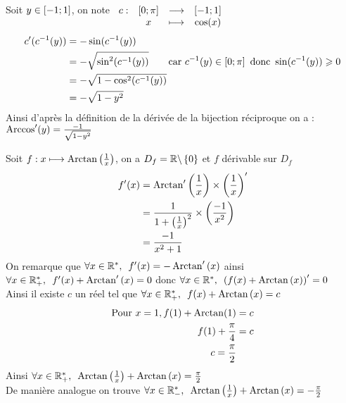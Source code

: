 \begin{dem}
	Soit \(y\in\left[-1;1\right]\), on note \(\begin{array}[t]{cccc}c : & \left[0;\pi\right] & \longrightarrow & \left[-1;1\right] \\ & x & \longmapsto & \cos(x)\end{array}\)
	\begin{align*}
		c'(c^{-1}(y)) & = -\sin(c^{-1}(y))                                                                                                \\
		              & = -\sqrt{\sin^2(c^{-1}(y))} \qquad  \text{car }c^{-1}(y)\in \left[0;\pi\right] \text{ donc } \sin(c^{-1}(y))\geqslant 0 \\
		              & = -\sqrt{1-\cos^2(c^{-1}(y))}                                                                                     \\
		              & = -\sqrt{1-y^2}                                                                                                   \\
	\end{align*}
	Ainsi d'après la définition de la dérivée de la bijection réciproque on a : \(\operatorname{Arccos}'(y) = \frac{-1}{\sqrt{1-y^2}}\)
\end{dem}

\begin{rem}
	Soit \(f:x\longmapsto \operatorname{Arctan}{\left(\frac{1}{x}\right)}\), on a \(D_f = \mathbb{R}\backslash\left\lbrace0\right\rbrace\) et \(f\) dérivable sur \(D_f\)
	\begin{align*}
		f'(x) & = \operatorname{Arctan}'\left(\frac{1}{x}\right) \times \left(\frac{1}{x}\right)'         \\
		      & = \frac{1}{1+\left(\frac{1}{x}\right)^2} \times \left(\frac{-1}{x^2}\right) \\
		      & = \frac{-1}{x^2+1}
	\end{align*}
	On remarque que \(\quantifs{\forall x \in \Rs}f'(x) = -\Arctan'\paren{x}\) ainsi \(\quantifs{\forall x \in \Rps}f'(x) +\Arctan'\paren{x} = 0\) donc \(\quantifs{\forall x \in \Rs}\paren{f(x)+\Arctan\paren{x}}'=0\) \\
	Ainsi il existe \(c\) un réel tel que \(\quantifs{\forall x \in \Rps}f(x) + \Arctan\paren{x} = c\)
	\begin{align*}
		\text{Pour } x = 1, f(1) + \operatorname{Arctan}(1) & = c \\
		f(1) + \frac{\pi}{4}                  & = c \\
		c = \frac{\pi}{2}
	\end{align*}
	Ainsi \(\quantifs{\forall x \in \Rps} \Arctan\paren{\frac{1}{x}} + \Arctan\paren{x} = \frac{\pi}{2}\) \\
	De manière analogue on trouve  \(\quantifs{\forall x \in \Rms} \Arctan\paren{\frac{1}{x}} + \Arctan\paren{x} = -\frac{\pi}{2}\) \\
\end{rem}